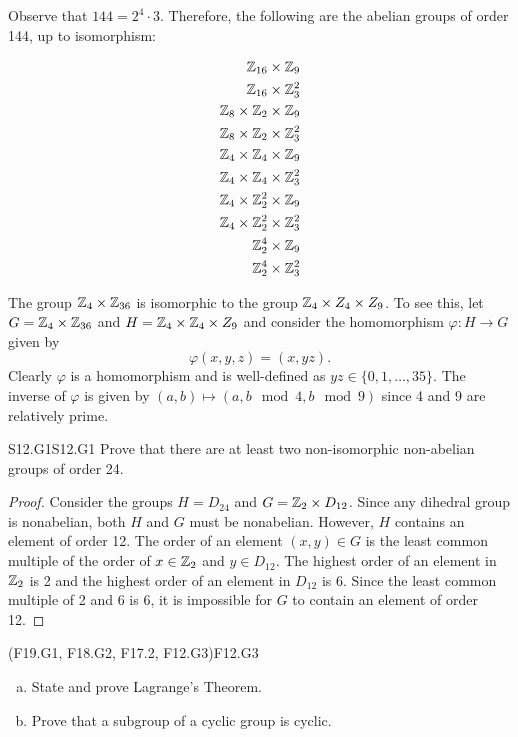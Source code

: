 \documentclass[../../AlgebraQualSolutions.tex]{subfiles}
\begin{document}
\begin{solution}
Observe that $144 = 2^4 \cdot 3$. Therefore, the following are the abelian groups of order 144, up to isomorphism:

\begin{align*}
	\mathbb{Z}_{16} \times \mathbb{Z}_9 \\
	\mathbb{Z}_{16} \times \mathbb{Z}_3^2 \\
	\mathbb{Z}_8 \times \mathbb{Z}_2 \times \mathbb{Z}_9 \\
	\mathbb{Z}_8 \times \mathbb{Z}_2 \times \mathbb{Z}_3^2\\
	\mathbb{Z}_4 \times \mathbb{Z}_4 \times \mathbb{Z}_9 \\
	\mathbb{Z}_4 \times \mathbb{Z}_4 \times \mathbb{Z}_3^2\\
	\mathbb{Z}_4 \times \mathbb{Z}_2^2 \times \mathbb{Z}_9 \\
	\mathbb{Z}_4 \times \mathbb{Z}_2^2 \times \mathbb{Z}_3^2 \\
	\mathbb{Z}_2^4 \times \mathbb{Z}_9 \\
	\mathbb{Z}_2^4 \times \mathbb{Z}_3^2 \\
\end{align*}

The group $\mathbb{Z}_4 \times \mathbb{Z}_{36}$ is isomorphic to the group $\mathbb{Z}_4 \times Z_4 \times Z_9$. To see this, let $G = \mathbb{Z}_4 \times \mathbb{Z}_{36}$ and $H = \mathbb{Z}_4 \times \mathbb{Z}_{4} \times Z_9$ and consider the homomorphism $\varphi: H \to G$ given by
	\[\varphi(x,y,z) = (x,yz). \]
Clearly $\varphi$ is a homomorphism and is well-defined as $yz \in \{0,1, \ldots, 35\}$. The inverse of $\varphi$ is given by $(a,b) \mapsto(a,b\mod{4},b\mod{9})$ since 4 and 9 are relatively prime.
\end{solution}

\begin{prob}{S12.G1}{S12.G1}
	Prove that there are at least two non-isomorphic non-abelian groups of order 24.
\end{prob}

\begin{proof}
	Consider the groups $H = D_{24}$ and $G = \mathbb{Z}_2 \times D_{12}$. Since any dihedral group is nonabelian, both $H$ and $G$ must be nonabelian. However, $H$ contains an element of order 12. The order of an element $(x,y) \in G$ is the least common multiple of the order of $x \in \mathbb{Z}_2$ and $y \in D_{12}$. The highest order of an element in $\mathbb{Z}_2$ is 2 and the highest order of an element in $D_{12}$ is 6. Since the least common multiple of 2 and 6 is 6, it is impossible for $G$ to contain an element of order 12.
\end{proof}

	\begin{prob}{(F19.G1, F18.G2, F17.2, F12.G3)}{F12.G3}
	\begin{enumerate}[(a)]
	\item State and prove Lagrange's Theorem.
	\item Prove that a subgroup of a cyclic group is cyclic.
	\end{enumerate}
	\end{prob}
	
\end{document}
